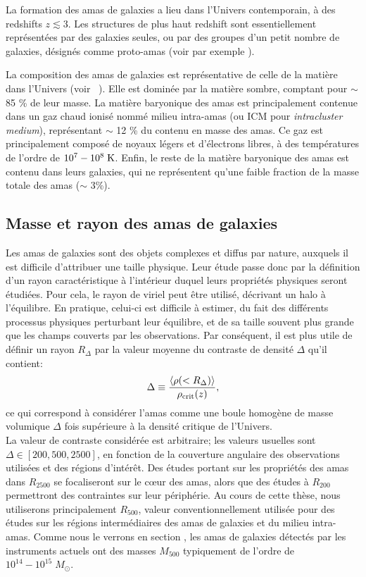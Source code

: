 La formation des amas de galaxies a lieu dans l'Univers contemporain, à des redshifts $z \lesssim 3$.
Les structures de plus haut redshift sont essentiellement représentées par des galaxies seules, ou par des groupes d'un petit nombre de galaxies, désignés comme proto-amas (voir par exemple \cite{zhou_goods-alma_2020}).

La composition des amas de galaxies est représentative de celle de la matière dans l'Univers (voir \eg\ \cite{pratt_galaxy_2019}).
Elle est dominée par la matière sombre, comptant pour $\sim$ 85 \% de leur masse.
La matière baryonique des amas est principalement contenue dans un gaz chaud ionisé nommé milieu intra-amas (ou ICM pour \textit{intracluster medium}), représentant $\sim$ 12 \% du contenu en masse des amas.
Ce gaz est principalement composé de noyaux légers et d'électrons libres, à des températures de l'ordre de $10^7 - 10^8 \;{\rm K}$.
Enfin, le reste de la matière baryonique des amas est contenu dans leurs galaxies, qui ne représentent qu'une faible fraction de la masse totale des amas ($\sim$ 3\%).

\subsection{Masse et rayon des amas de galaxies} \label{sec:int_quant}

Les amas de galaxies sont des objets complexes et diffus par nature, auxquels il est difficile d'attribuer une taille physique.
Leur étude passe donc par la définition d'un rayon caractéristique à l'intérieur duquel leurs propriétés physiques seront étudiées.
Pour cela, le rayon de viriel peut être utilisé, décrivant un halo à l'équilibre.
En pratique, celui-ci est difficile à estimer, du fait des différents processus physiques perturbant leur équilibre, et de sa taille souvent plus grande que les champs couverts par les observations.
Par conséquent, il est plus utile de définir un rayon $R_\Delta$ par la valeur moyenne du contraste de densité $\Delta$ qu'il contient:
\begin{equation}
    \label{eq:cluster_contrast_R}
    \Delta \equiv \frac{\left<\rho(<R_\Delta)\right>}{\rho_{\rm crit}(z)},
\end{equation}
ce qui correspond à considérer l'amas comme une boule homogène de masse volumique $\Delta$ fois supérieure à la densité critique de l'Univers. \\
La valeur de contraste considérée est arbitraire; les valeurs usuelles sont $\Delta \in [200, 500, 2500]$, en fonction de la couverture angulaire des observations utilisées et des régions d'intérêt.
Des études portant sur les propriétés des amas dans $R_{2500}$ se focaliseront sur le cœur des amas, alors que des études à $R_{200}$ permettront des contraintes sur leur périphérie.
Au cours de cette thèse, nous utiliserons principalement $R_{500}$, valeur conventionnellement utilisée pour des études sur les régions intermédiaires des amas de galaxies et du milieu intra-amas.
Comme nous le verrons en section , les amas de galaxies détectés par les instruments actuels ont des masses $M_{500}$ typiquement de l'ordre de $10^{14} - 10^{15} \;M_\odot$.

